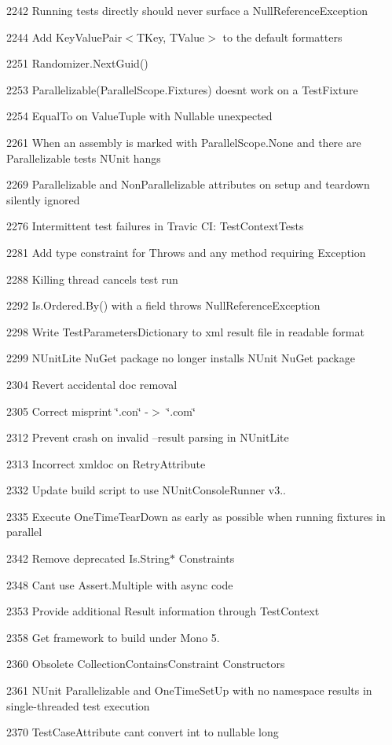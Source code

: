 \begin{DoxyItemize}
\item 2242 Running tests directly should never surface a Null\+Reference\+Exception
\item 2244 Add Key\+Value\+Pair$<$\+T\+Key, T\+Value$>$ to the default formatters
\item 2251 Randomizer.\+Next\+Guid()
\item 2253 Parallelizable(Parallel\+Scope.\+Fixtures) doesn\textquotesingle{}t work on a Test\+Fixture
\item 2254 Equal\+To on Value\+Tuple with Nullable unexpected
\item 2261 When an assembly is marked with Parallel\+Scope.\+None and there are Parallelizable tests N\+Unit hangs
\item 2269 Parallelizable and Non\+Parallelizable attributes on setup and teardown silently ignored
\item 2276 Intermittent test failures in Travic CI\+: Test\+Context\+Tests
\item 2281 Add type constraint for Throws and any method requiring Exception
\item 2288 Killing thread cancels test run
\item 2292 Is.\+Ordered.\+By() with a field throws Null\+Reference\+Exception
\item 2298 Write Test\+Parameters\+Dictionary to xml result file in readable format
\item 2299 N\+Unit\+Lite Nu\+Get package no longer installs N\+Unit Nu\+Get package
\item 2304 Revert accidental doc removal
\item 2305 Correct misprint \char`\"{}.\+con\char`\"{} -\/$>$ \char`\"{}.\+com\char`\"{}
\item 2312 Prevent crash on invalid --result parsing in N\+Unit\+Lite
\item 2313 Incorrect xmldoc on Retry\+Attribute
\item 2332 Update build script to use N\+Unit\+Console\+Runner v3..
\item 2335 Execute One\+Time\+Tear\+Down as early as possible when running fixtures in parallel
\item 2342 Remove deprecated Is.\+String$\ast$ Constraints
\item 2348 Can\textquotesingle{}t use Assert.\+Multiple with async code
\item 2353 Provide additional Result information through Test\+Context
\item 2358 Get framework to build under Mono 5.
\item 2360 Obsolete Collection\+Contains\+Constraint Constructors
\item 2361 N\+Unit Parallelizable and One\+Time\+Set\+Up with no namespace results in single-\/threaded test execution
\item 2370 Test\+Case\+Attribute can\textquotesingle{}t convert int to nullable long
\end{DoxyItemize}

